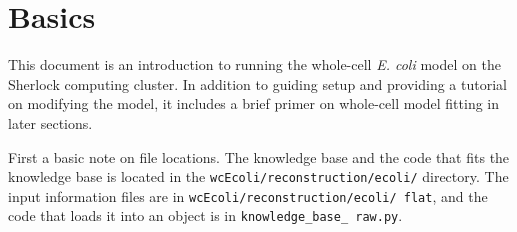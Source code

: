 \documentclass[12pt]{article}
\begin{document}
\maketitle

\section{Basics}

This document is an introduction to running the whole-cell \textit{E. coli} model on the Sherlock computing cluster. In addition to guiding setup and providing a tutorial on modifying the model, it includes a brief primer on whole-cell model fitting in later sections.
\par
First a basic note on file locations. The knowledge base and the code that fits the knowledge base is located in the \texttt{wcEcoli/reconstruction/ecoli/} directory. The input information files are in \texttt{wcEcoli/reconstruction/ecoli/ \allowbreak flat}, and the code that loads it into an object is in \texttt{knowledge\_base\_ \allowbreak raw.py}.
\par
\end{document}
